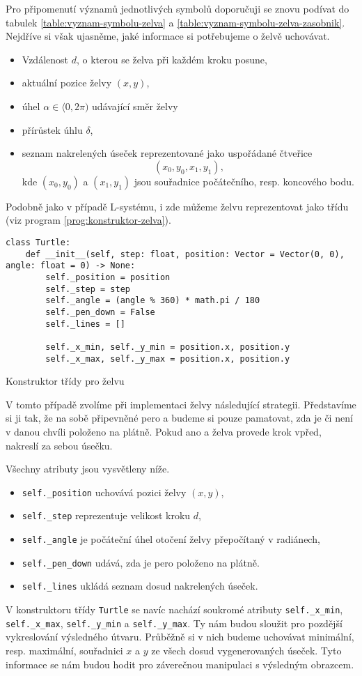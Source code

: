 Pro připomenutí významů jednotlivých symbolů doporučuji se znovu podívat do tabulek \ref{table:vyznam-symbolu-zelva} a \ref{table:vyznam-symbolu-zelva-zasobnik}. Nejdříve si však ujasněme, jaké informace si potřebujeme o želvě uchovávat.
\begin{itemize}
    \item Vzdálenost $d$, o kterou se želva při každém kroku posune,
    \item aktuální pozice želvy $(x,y)$,
    \item úhel $\alpha\in\langle 0,2\pi)$ udávající směr želvy
    \item přírůstek úhlu $\delta$,
    \item seznam nakrelených úseček reprezentované jako uspořádané čtveřice
    \[(x_0,y_0,x_1,y_1),\]
    kde $(x_0,y_0)$ a $(x_1,y_1)$ jsou souřadnice počátečního, resp. koncového bodu.
\end{itemize}
Podobně jako v případě L-systému, i zde můžeme želvu reprezentovat jako třídu (viz program \ref{prog:konstruktor-zelva}).
\begin{program}[h]
\begin{lstlisting}[style=python]
class Turtle:
    def __init__(self, step: float, position: Vector = Vector(0, 0), angle: float = 0) -> None:
        self._position = position
        self._step = step
        self._angle = (angle % 360) * math.pi / 180
        self._pen_down = False
        self._lines = []

        self._x_min, self._y_min = position.x, position.y
        self._x_max, self._y_max = position.x, position.y
\end{lstlisting}
    \caption{Konstruktor třídy pro želvu}
    \label{prog:konstruktor-zelva}
\end{program}

V tomto případě zvolíme při implementaci želvy následující strategii. Představíme si ji tak, že na sobě připevněné pero a budeme si pouze pamatovat, zda je či není v danou chvíli položeno na plátně. Pokud ano a želva provede krok vpřed, nakreslí za sebou úsečku.

Všechny atributy jsou vysvětleny níže.
\begin{itemize}
    \item \texttt{self.\_position} uchovává pozici želvy $(x,y)$,
    \item \texttt{self.\_step} reprezentuje velikost kroku $d$,
    \item \texttt{self.\_angle} je počáteční úhel otočení želvy přepočítaný v radiánech,
    \item \texttt{self.\_pen\_down} udává, zda je pero položeno na plátně.
    \item \texttt{self.\_lines} ukládá seznam dosud nakrelených úseček.
\end{itemize}
V konstruktoru třídy \texttt{Turtle} se navíc nachází soukromé atributy \texttt{self.\_x\_min}, \texttt{self.\_x\_max}, \texttt{self.\_y\_min} a \texttt{self.\_y\_max}. Ty nám budou sloužit pro pozdější vykreslování výsledného útvaru. Průběžně si v nich budeme uchovávat minimální, resp. maximální, souřadnici $x$ a $y$ ze všech dosud vygenerovaných úseček. Tyto informace se nám budou hodit pro záverečnou manipulaci s výsledným obrazcem.

